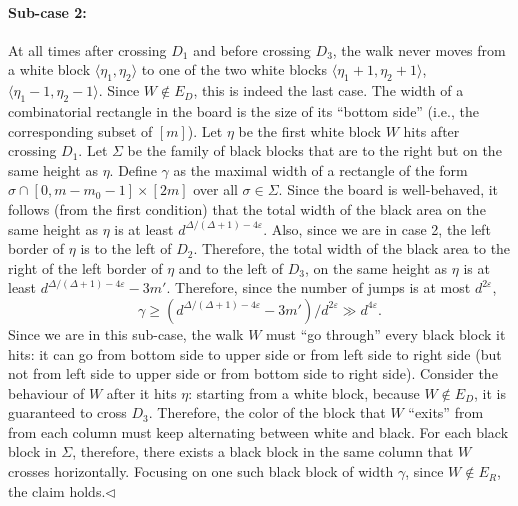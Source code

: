 \documentclass[10pt,a4paper]{article}
\begin{document}
\paragraph{Sub-case 2:} At all times after crossing $D_1$ and before crossing $D_3$, the walk never moves from a white block $\langle\eta_1,\eta_2\rangle$ to one of the two white blocks $\langle\eta_1+1,\eta_2+1\rangle$, $\langle\eta_1-1,\eta_2-1\rangle$. Since $W\notin E_D$, this is indeed the last case. The width of a combinatorial rectangle in the board is the size of its ``bottom side'' (i.e., the corresponding subset of $[m]$). Let $\eta$ be the first white block $W$ hits after crossing $D_1$. Let $\Sigma$ be the family of black blocks that are to the right but on the same height as $\eta$. Define $\gamma$ as the maximal width of a rectangle of the form $\sigma\cap[0,m-m_0-1]\times[2m]$ over all $\sigma\in\Sigma$. Since the board is well-behaved, it follows (from the first condition) that the total width of the black area on the same height as $\eta$ is at least $d^{\Delta/(\Delta+1)-4\varepsilon}$. Also, since we are in case 2, the left border of $\eta$ is to the left of $D_2$. Therefore, the total width of the black area to the right of the left border of $\eta$ and to the left of $D_3$, on the same height as $\eta$ is at least $d^{\Delta/(\Delta+1)-4\varepsilon}-3m'$. Therefore, since the number of jumps is at most $d^{2\varepsilon}$,
\[\gamma\geq(d^{\Delta/(\Delta+1)-4\varepsilon}-3m')/d^{2\varepsilon}\gg d^{4\varepsilon}.\]
Since we are in this sub-case, the walk $W$ must ``go through'' every black block it hits: it can go from bottom side to upper side or from left side to right side (but not from left side to upper side or from bottom side to right side). Consider the behaviour of $W$ after it hits $\eta$: starting from a white block, because $W\notin E_D$, it is guaranteed to cross $D_3$. Therefore, the color of the block that $W$ ``exits'' from from each column must keep alternating between white and black. For each black block in $\Sigma$, therefore, there exists a black block in the same column that $W$ crosses horizontally. Focusing on one such black block of width $\gamma$, since $W\notin E_R$, the claim holds.\hfill$\triangleleft$
\end{document}
